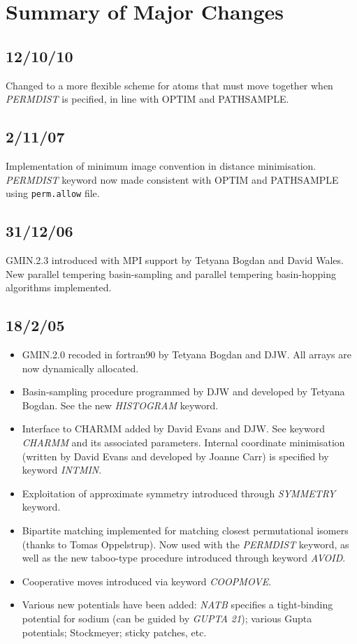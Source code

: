 \documentclass[12pt,a4paper,dvips]{article}
\begin{document}
\section{Summary of Major Changes}

\subsection{12/10/10}
Changed to a more flexible scheme for atoms that must move together when
{\it PERMDIST\/} is pecified, in line with OPTIM and PATHSAMPLE.

\subsection{2/11/07}
Implementation of minimum image convention in distance minimisation.
{\it PERMDIST} keyword now made consistent with OPTIM and PATHSAMPLE
using {\tt perm.allow} file.

\subsection{31/12/06}
GMIN.2.3 introduced with MPI support by Tetyana Bogdan and David Wales.
New parallel tempering basin-sampling and
parallel tempering basin-hopping algorithms implemented.

\subsection{18/2/05}
\begin{itemize}
\item GMIN.2.0 recoded in fortran90 by Tetyana Bogdan and DJW. All arrays are now dynamically allocated.
\item Basin-sampling procedure programmed by DJW and developed by Tetyana Bogdan. See the new
{\it HISTOGRAM} keyword.
\item Interface to CHARMM added by David Evans and DJW. See keyword {\it CHARMM} and its associated 
parameters. Internal coordinate minimisation (written by David Evans and developed by Joanne Carr) 
is specified by keyword {\it INTMIN}.
\item Exploitation of approximate symmetry introduced through {\it SYMMETRY} keyword.
\item Bipartite matching implemented for matching closest permutational isomers
(thanks to Tomas Oppelstrup). Now used with 
the {\it PERMDIST} keyword, as well as the new taboo-type procedure introduced through keyword {\it AVOID}.
\item Cooperative moves introduced via keyword {\it COOPMOVE}.
\item Various new potentials have been added: {\it NATB} specifies a tight-binding potential
for sodium (can be guided by {\it GUPTA 21}); various Gupta potentials; Stockmeyer; sticky patches, etc.
\end{itemize}
\end{document}
